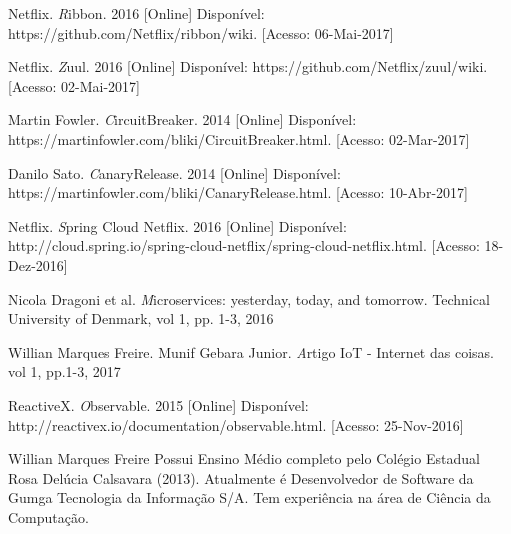 \documentclass[journal]{IEEEtran}
\begin{document}
\begin{thebibliography}{1}
Netflix. \emph Ribbon. 2016 [Online] Disponível: https://github.com/Netflix/ribbon/wiki. [Acesso: 06-Mai-2017]

Netflix. \emph Zuul. 2016 [Online] Disponível: https://github.com/Netflix/zuul/wiki. [Acesso: 02-Mai-2017]

Martin Fowler. \emph CircuitBreaker. 2014 [Online] Disponível: https://martinfowler.com/bliki/CircuitBreaker.html. [Acesso: 02-Mar-2017]

Danilo Sato. \emph CanaryRelease. 2014 [Online] Disponível: https://martinfowler.com/bliki/CanaryRelease.html. [Acesso: 10-Abr-2017]

Netflix. \emph Spring Cloud Netflix. 2016 [Online] Disponível: http://cloud.spring.io/spring-cloud-netflix/spring-cloud-netflix.html. [Acesso: 18-Dez-2016]

Nicola Dragoni et al. \emph Microservices: yesterday, today, and tomorrow. Technical University of Denmark, vol 1, pp. 1-3, 2016

Willian Marques Freire. Munif Gebara Junior. \emph Artigo IoT - Internet das coisas. vol 1, pp.1-3, 2017

ReactiveX. \emph Observable. 2015 [Online] Disponível: http://reactivex.io/documentation/observable.html. [Acesso: 25-Nov-2016]

\end{thebibliography}


\begin{IEEEbiography}{Willian Marques Freire}
Possui Ensino Médio completo pelo Colégio Estadual Rosa Delúcia Calsavara (2013). Atualmente é Desenvolvedor de Software da Gumga Tecnologia da Informação S/A. Tem experiência na área de Ciência da Computação.
\end{IEEEbiography}
\end{document}
